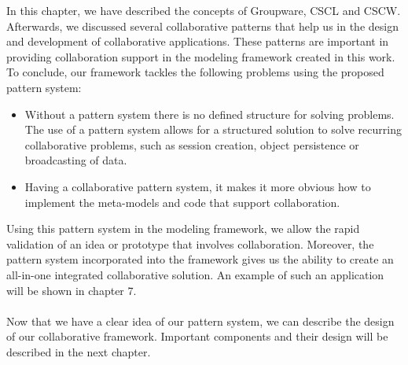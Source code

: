 In this chapter, we have described the concepts of Groupware, CSCL and CSCW. Afterwards, we discussed several collaborative patterns that help us in the design and development of collaborative applications. These patterns are important in providing collaboration support in the modeling framework created in this work. To conclude, our framework tackles the following problems using the proposed pattern system:
\begin{itemize}
\item{Without a pattern system there is no defined structure for solving problems. The use of a pattern system allows for a structured solution to solve recurring collaborative problems, such as session creation, object persistence or broadcasting of data.}
\item{Having a collaborative pattern system, it makes it more obvious how to implement the meta-models and code that support collaboration.}
\end{itemize}
Using this pattern system in the modeling framework, we allow the rapid validation of an idea or prototype that involves collaboration. Moreover, the pattern system incorporated into the framework gives us the ability to create an all-in-one integrated collaborative solution. An example of such an application will be shown in chapter 7. \\ \\
Now that we have a clear idea of our pattern system, we can describe the design of our collaborative framework. Important components and their design will be described in the next chapter.

